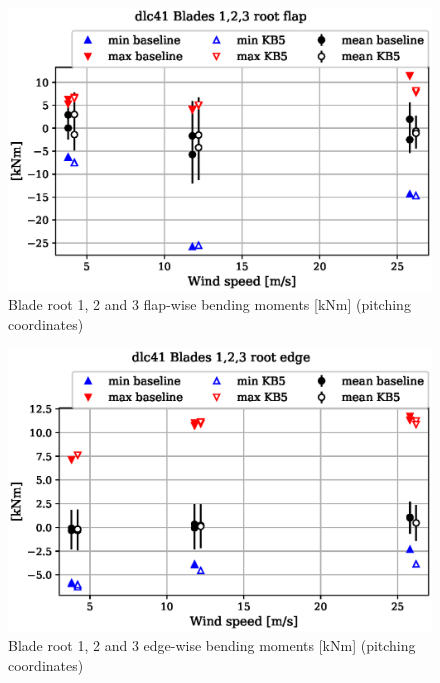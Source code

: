 \begin{figure}[!ht]
\begin{center}
	\includegraphics[width=.85\linewidth]{figures/baseline-vs-KB6/dlc41/blade1-blade1-node-001-momentvec-x_AA0008_AA0008.eps}
\end{center}
\caption{Blade root 1, 2 and 3 flap-wise bending moments [kNm] (pitching coordinates)}
\label{fig:baseline-vs-KB6:dlc41:blade-root-flap}
\end{figure}

\begin{figure}[!ht]
\begin{center}
	\includegraphics[width=.85\linewidth]{figures/baseline-vs-KB6/dlc41/blade1-blade1-node-001-momentvec-y_AA0008_AA0008.eps}
\end{center}
\caption{Blade root 1, 2 and 3 edge-wise bending moments [kNm] (pitching coordinates)}
\label{fig:baseline-vs-KB6:dlc41:blade-root-edge}
\end{figure}

